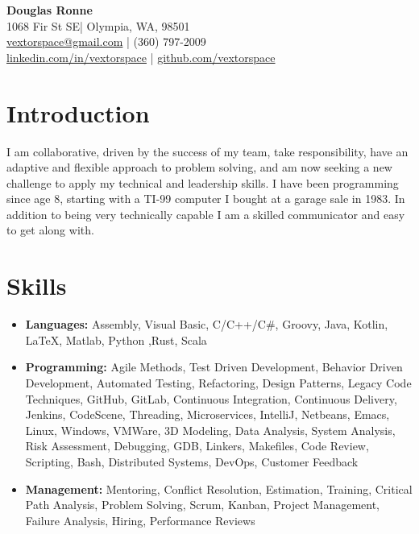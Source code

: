 \documentclass[letter,11pt]{article}
\begin{document}
\begin{center}
    {\Huge \textbf{Douglas Ronne}}\\
    \vspace{2mm}
    1068 Fir St SE| Olympia, WA, 98501\\
    \href{mailto:vextorspace@gmail.com}{vextorspace@gmail.com} | (360) 797-2009\\
    \href{https://www.linkedin.com/in/vextorspace}{linkedin.com/in/vextorspace} | \href{https://github.com/vextorspace}{github.com/vextorspace}
\end{center}

\section*{Introduction}

I am collaborative, driven by the success of my team, take responsibility, have an adaptive and flexible approach to problem solving, and am now seeking a new challenge to apply my technical and leadership skills. I have been programming since age 8, starting with a TI-99 computer I bought at a garage sale in 1983. In addition to being very technically capable I am a skilled communicator and easy to get along with.

\section*{Skills}
\begin{itemize}[leftmargin=*,itemsep=0pt, parsep=0pt,label=$\diamond$]
\item \textbf{Languages:} Assembly, Visual Basic, C/C++/C\#, Groovy, Java, Kotlin, LaTeX, Matlab, Python ,Rust, Scala
\item \textbf{Programming:} Agile Methods, Test Driven Development, Behavior Driven Development, Automated Testing, Refactoring, Design Patterns, Legacy Code Techniques, GitHub, GitLab, Continuous Integration, Continuous Delivery, Jenkins, CodeScene, Threading, Microservices, IntelliJ, Netbeans, Emacs, Linux, Windows, VMWare, 3D Modeling, Data Analysis, System Analysis, Risk Assessment, Debugging, GDB, Linkers, Makefiles, Code Review, Scripting, Bash, Distributed Systems, DevOps, Customer Feedback
\item \textbf{Management:} Mentoring, Conflict Resolution, Estimation, Training, Critical Path Analysis, Problem Solving, Scrum, Kanban, Project Management, Failure Analysis, Hiring, Performance Reviews
\end{itemize}
\end{document}
